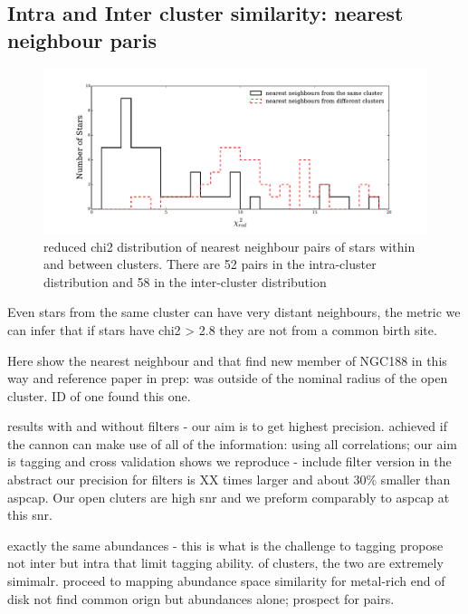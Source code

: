 \documentclass[14pt, preprint2]{aastex6}
\begin{document}
\subsection{Intra and Inter cluster similarity: nearest neighbour paris}

\begin{figure}[h!]
\includegraphics[scale=0.2]{chi2red.pdf} 
  \caption{reduced chi2 distribution of nearest neighbour pairs of stars within and between clusters. There are 52 pairs in the intra-cluster distribution and 58 in the inter-cluster distribution}
\label{fig:snr_error}
\end{figure}

Even stars from the same cluster can have very distant neighbours, the metric we can infer that if stars have chi2 > 2.8 they are not from a common birth site. 

Here show the nearest neighbour and that find new member of NGC188 in this way and reference paper in prep: was outside of the nominal radius of the open cluster. ID of one found this one. 



results with and without filters
- our aim is to get highest precision. achieved if the cannon can make use of all of the information: using all correlations; our aim is tagging and cross validation shows we reproduce - include filter version in the abstract
our precision for filters is XX times larger and about 30\% smaller than aspcap. Our open cluters are high snr and we preform comparably to aspcap at this snr. 


 exactly the same abundances - this is what is the challenge to tagging 
propose not inter but intra that limit tagging ability.
of clusters, the two are extremely simimalr. 
proceed to mapping abundance space similarity for metal-rich end of disk not find common orign but abundances alone; prospect for pairs. 
\end{document}
